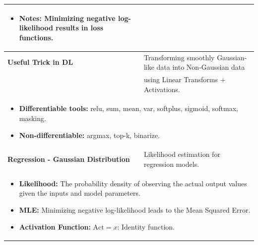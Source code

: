 \begin{summary}
\begin{center}
\begin{tabular}{ll}
{                \begin{itemize}
                    \item \textbf{Notes:} Minimizing negative log-likelihood results in loss functions.
                \end{itemize}
            } \\
            \midrule
            \textbf{Useful Trick in DL} & Transforming smoothly Gaussian-like data into Non-Gaussian data \\
            & using Linear Transforms + Activations. \\
            \multicolumn{2}{p{\linewidth}}{
                \begin{itemize}
                    \item \textbf{Differentiable tools:} relu, sum, mean, var, softplus, sigmoid, softmax, masking.
                    \item \textbf{Non-differentiable:} argmax, top-k, binarize.
                \end{itemize}
            } \\
            \midrule
            \textbf{Regression - Gaussian Distribution} & Likelihood estimation for regression models. \\
            \multicolumn{2}{p{\linewidth}}{
                \begin{itemize}
                    \item \textbf{Likelihood:} The probability density of observing the actual output values given the inputs and model parameters.
                    \item \textbf{MLE:} Minimizing negative log-likelihood leads to the Mean Squared Error.
                    \item \textbf{Activation Function:} $\text{Act} = x$: Identity function.
                \end{itemize}
            } \\
            \bottomrule
        \end{tabular}
    \end{center}
\end{summary}


